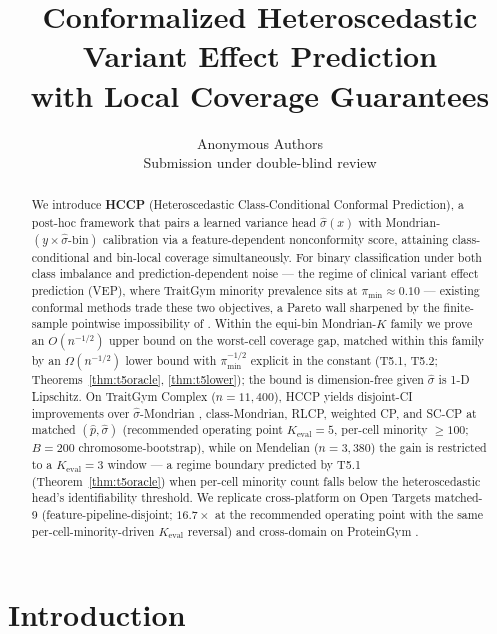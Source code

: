 \documentclass{article}
\title{Conformalized Heteroscedastic Variant Effect Prediction\\
with Local Coverage Guarantees}
\author{%
  Anonymous Authors \\
  Submission under double-blind review
}
\newcommand{\phat}{\hat{p}}
\newcommand{\shat}{\hat{\sigma}}
\begin{document}
\maketitle

\begin{abstract}
We introduce \textbf{HCCP} (Heteroscedastic Class-Conditional Conformal Prediction), a post-hoc framework that pairs a learned variance head $\shat(x)$ with Mondrian-$(y \times \shat\text{-bin})$ calibration via a feature-dependent nonconformity score, attaining class-conditional and bin-local coverage simultaneously. For binary classification under both class imbalance and prediction-dependent noise --- the regime of clinical variant effect prediction (VEP), where TraitGym \citep{benegas2025traitgym} minority prevalence sits at $\pi_{\min} \approx 0.10$ --- existing conformal methods trade these two objectives, a Pareto wall sharpened by the finite-sample pointwise impossibility of \citet{barber2020limits}. Within the equi-bin Mondrian-$K$ family we prove an $O(n^{-1/2})$ upper bound on the worst-cell coverage gap, matched within this family by an $\Omega(n^{-1/2})$ lower bound with $\pi_{\min}^{-1/2}$ explicit in the constant (T5.1, T5.2; Theorems~\ref{thm:t5oracle}, \ref{thm:t5lower}); the bound is dimension-free given $\shat$ is 1-D Lipschitz.
On TraitGym Complex ($n=11{,}400$), HCCP yields disjoint-CI improvements over $\shat$-Mondrian \citep{bostrom2020mondrian}, class-Mondrian, RLCP, weighted CP, and SC-CP at matched $(\phat, \shat)$ (recommended operating point $K_{\mathrm{eval}}=5$, per-cell minority $\geq 100$; $B=200$ chromosome-bootstrap), while on Mendelian ($n=3{,}380$) the gain is restricted to a $K_{\mathrm{eval}}=3$ window --- a regime boundary predicted by T5.1 (Theorem~\ref{thm:t5oracle}) when per-cell minority count falls below the heteroscedastic head's identifiability threshold.
We replicate cross-platform on Open Targets matched-9 \citep{ochoa2023opentargets} (feature-pipeline-disjoint; $16.7\times$ at the recommended operating point with the same per-cell-minority-driven $K_{\mathrm{eval}}$ reversal) and cross-domain on ProteinGym \citep{notin2023proteingym}.
\end{abstract}

\section{Introduction}
\label{sec:intro}
\end{document}
